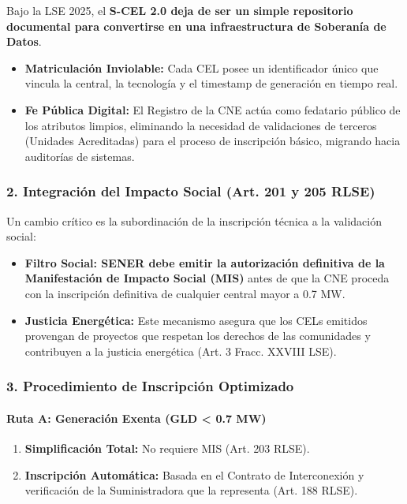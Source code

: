 \documentclass{cel}
\begin{document}
Bajo la LSE 2025, el \textbf{S-CEL 2.0 \textbf{ deja de ser un simple repositorio documental para convertirse en una infraestructura de }Soberanía de Datos}.


\begin{itemize}
\item \textbf{Matriculación Inviolable:} Cada CEL posee un identificador único que vincula la central, la tecnología y el timestamp de generación en tiempo real.
\item \textbf{Fe Pública Digital:} El Registro de la CNE actúa como fedatario público de los atributos limpios, eliminando la necesidad de validaciones de terceros (Unidades Acreditadas) para el proceso de inscripción básico, migrando hacia auditorías de sistemas.

\end{itemize}
\subsubsection{2. Integración del Impacto Social (Art. 201 y 205 RLSE)}
\nopagebreak

Un cambio crítico es la subordinación de la inscripción técnica a la validación social:


\begin{itemize}
\item \textbf{Filtro Social: \textbf{ SENER debe emitir la autorización definitiva de la }Manifestación de Impacto Social (MIS)} antes de que la CNE proceda con la inscripción definitiva de cualquier central mayor a 0.7 MW.
\item \textbf{Justicia Energética:} Este mecanismo asegura que los CELs emitidos provengan de proyectos que respetan los derechos de las comunidades y contribuyen a la justicia energética (Art. 3 Fracc. XXVIII LSE).

\end{itemize}
\subsubsection{3. Procedimiento de Inscripción Optimizado}
\nopagebreak

\paragraph{Ruta A: Generación Exenta (GLD \textless{} 0.7 MW)}
\nopagebreak

\begin{enumerate}
\item \textbf{Simplificación Total:} No requiere MIS (Art. 203 RLSE).
\item \textbf{Inscripción Automática:} Basada en el Contrato de Interconexión y verificación de la Suministradora que la representa (Art. 188 RLSE).

\end{enumerate}
\end{document}
